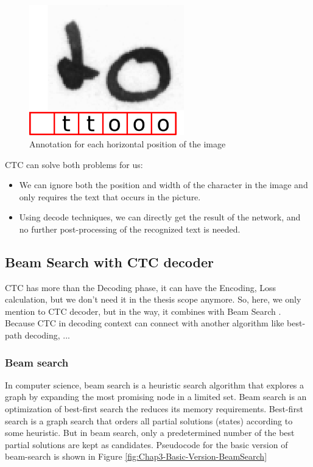 \begin{figure}[H]
	\centering
	\includegraphics[width=0.6\textwidth]{img/Chap3/Annotation-image-CTC}
	\caption{ Annotation for each horizontal position of the image }
	\label{fig:Chap3-Annottion-image-CTC}
\end{figure}

CTC can solve both problems for us:
\begin{itemize}
	\item We can ignore both the position and width of the character in the image and only requires the text that occurs in the picture.
	\item Using decode techniques, we can directly get the result of the network, and no further post-processing of the recognized text is needed.
\end{itemize}

\subsection{Beam Search with CTC decoder}
CTC has more than the Decoding phase, it can have the Encoding, Loss calculation, but we don't need it in the thesis scope anymore. So, here, we only mention to CTC decoder, but in the way, it combines with Beam Search \cite{scheidl2018word}. Because CTC in decoding context can connect with another algorithm like best-path decoding, ...

\subsubsection{Beam search}

In computer science, beam search \cite{BeamSearch} is a heuristic search algorithm that explores a graph by expanding the most promising node in a limited set. Beam search is an optimization of best-first search the reduces its memory requirements. Best-first search is a graph search that orders all partial solutions (states) according to some heuristic. But in beam search, only a predetermined number of the best partial solutions are kept as candidates. Pseudocode for the basic version of beam-search is shown in Figure \ref{fig:Chap3-Basic-Version-BeamSearch}

